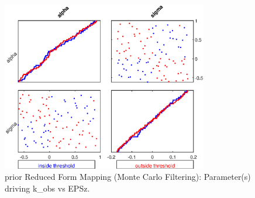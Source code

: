 
\begin{figure}[H]
\centering 
\includegraphics[width=0.8\textwidth]{RBC_kz/gsa/redform_prior/k_obs_vs_EPSz_threshold/RBC_kz_prior_k_obs_vs_EPSz_threshold}
\caption{prior Reduced Form Mapping (Monte Carlo Filtering): Parameter(s) driving k\_obs vs EPSz.}\label{Fig:RBC_kz_prior_k_obs_vs_EPSz_threshold}
\end{figure}

